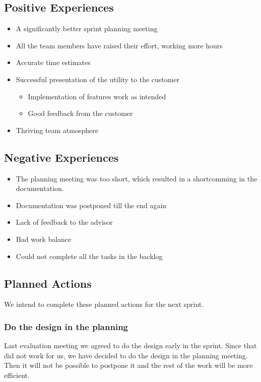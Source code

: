 \subsection{Positive Experiences}
\begin{itemize}
	\item A significantly better sprint planning meeting
	\item All the team members have raised their effort, working more hours
	\item Accurate time estimates
	\item Successful presentation of the utility to the customer
	\begin {itemize}
		\item Implementation of features work as intended
		\item Good feedback from the customer
	\end{itemize}
	\item Thriving team atmosphere
\end{itemize}



\subsection{Negative Experiences}
\begin{itemize}
	\item The planning meeting was too short, which resulted in a shortcomming in the documentation.
	\item Documentation was postponed till the end again
	\item Lack of feedback to the advisor
	\item Bad work balance
	\item Could not complete all the tasks in the backlog
\end{itemize}


\subsection{Planned Actions}
We intend to complete these planned actions for the next sprint.

\subsubsection{Do the design in the planning}
Last evaluation meeting we agreed to do the design early in the sprint. Since that did not work for us, we have decided to do the design in the planning meeting. Then it will not be possible to postpone it and the rest of the work will be more efficient. 

